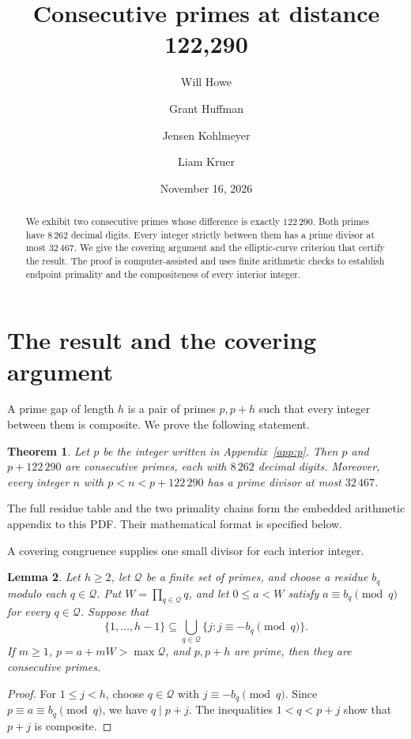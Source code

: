 \documentclass[11pt]{amsart}
\title[Consecutive primes at distance 122,290]{Consecutive primes at distance 122,290}
\author{Will Howe}
\author{Grant Huffman}
\author{Jensen Kohlmeyer}
\author{Liam Kruer}
\date{November 16, 2026}
\newtheorem{theorem}{Theorem}[section]
\newtheorem{lemma}[theorem]{Lemma}
\theoremstyle{definition}
\begin{document}
\begin{abstract}
We exhibit two consecutive primes whose difference is exactly $122\,290$.
Both primes have $8\,262$ decimal digits. Every integer strictly between them
has a prime divisor at most $32\,467$. We give the covering argument and the
elliptic-curve criterion that certify the result. The proof is computer-assisted and uses finite arithmetic checks to establish
endpoint primality and the compositeness of every interior integer.
\end{abstract}
\maketitle

\section{The result and the covering argument}
A prime gap of length $h$ is a pair of primes $p,p+h$ such that every integer
between them is composite. We prove the following statement.

\begin{theorem}\label{thm:main}
Let $p$ be the integer written in Appendix~\ref{app:p}. Then $p$ and
$p+122\,290$ are consecutive primes, each with $8\,262$ decimal digits.
Moreover, every integer $n$ with $p<n<p+122\,290$ has a prime divisor at
most $32\,467$.
\end{theorem}

The full residue table and the two primality chains form the embedded
arithmetic appendix to this PDF. Their mathematical format is specified below.

A covering congruence supplies one small divisor for each interior integer.

\begin{lemma}\label{lem:cover}
Let $h\ge2$, let $\mathcal Q$ be a finite set of primes, and choose a residue
$b_q$ modulo each $q\in\mathcal Q$. Put $W=\prod_{q\in\mathcal Q}q$, and
let $0\le a<W$ satisfy $a\equiv b_q\pmod q$ for every $q\in\mathcal Q$.
Suppose that
\[
 \{1,\ldots,h-1\}\subseteq
 \bigcup_{q\in\mathcal Q}\{j:j\equiv-b_q\pmod q\}.
\]
If $m\ge1$, $p=a+mW>\max\mathcal Q$, and $p,p+h$ are prime, then they are
consecutive primes.
\end{lemma}
\begin{proof}
For $1\le j<h$, choose $q\in\mathcal Q$ with $j\equiv-b_q\pmod q$.
Since $p\equiv a\equiv b_q\pmod q$, we have $q\mid p+j$.
The inequalities $1<q<p+j$ show that $p+j$ is composite.
\end{proof}
\end{document}
